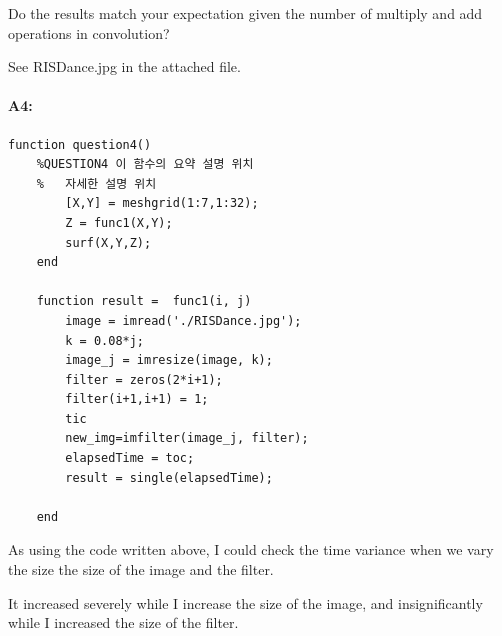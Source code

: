 	Do the results match your expectation given the number of multiply and add operations in convolution?
	
	See RISDance.jpg in the attached file.
	
	\paragraph{A4:} 
	\begin{lstlisting}[style=Matlab-editor]
	function question4()
    %QUESTION4 이 함수의 요약 설명 위치
    %   자세한 설명 위치
        [X,Y] = meshgrid(1:7,1:32);
        Z = func1(X,Y);
        surf(X,Y,Z);
    end

    function result =  func1(i, j) 
        image = imread('./RISDance.jpg');
        k = 0.08*j;
        image_j = imresize(image, k);
        filter = zeros(2*i+1);
        filter(i+1,i+1) = 1;
        tic
        new_img=imfilter(image_j, filter);
        elapsedTime = toc;
        result = single(elapsedTime);
       
    end
	\end{lstlisting}
	
	As using the code written above, I could check the time variance when we vary the size the size of the image and the filter.
	
	It increased severely while I increase the size of the image, and insignificantly while I increased the size of the filter.
	
	
	
	
	
	
